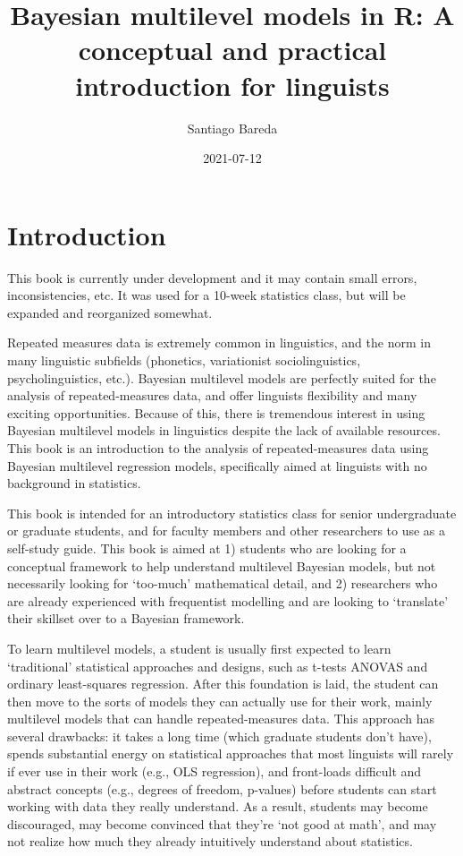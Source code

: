 \documentclass[
]{book}
\title{Bayesian multilevel models in R: A conceptual and practical introduction for linguists}
\author{Santiago Bareda}
\date{2021-07-12}
\begin{document}
\maketitle

{
\setcounter{tocdepth}{1}
\tableofcontents
}
\hypertarget{introduction}{%
\chapter*{Introduction}\label{introduction}}

This book is currently under development and it may contain small errors, inconsistencies, etc. It was used for a 10-week statistics class, but will be expanded and reorganized somewhat.

Repeated measures data is extremely common in linguistics, and the norm in many linguistic subfields (phonetics, variationist sociolinguistics, psycholinguistics, etc.). Bayesian multilevel models are perfectly suited for the analysis of repeated-measures data, and offer linguists flexibility and many exciting opportunities. Because of this, there is tremendous interest in using Bayesian multilevel models in linguistics despite the lack of available resources. This book is an introduction to the analysis of repeated-measures data using Bayesian multilevel regression models, specifically aimed at linguists with no background in statistics.

This book is intended for an introductory statistics class for senior undergraduate or graduate students, and for faculty members and other researchers to use as a self-study guide. This book is aimed at 1) students who are looking for a conceptual framework to help understand multilevel Bayesian models, but not necessarily looking for `too-much' mathematical detail, and 2) researchers who are already experienced with frequentist modelling and are looking to `translate' their skillset over to a Bayesian framework.

To learn multilevel models, a student is usually first expected to learn `traditional' statistical approaches and designs, such as t-tests ANOVAS and ordinary least-squares regression. After this foundation is laid, the student can then move to the sorts of models they can actually use for their work, mainly multilevel models that can handle repeated-measures data. This approach has several drawbacks: it takes a long time (which graduate students don't have), spends substantial energy on statistical approaches that most linguists will rarely if ever use in their work (e.g., OLS regression), and front-loads difficult and abstract concepts (e.g., degrees of freedom, p-values) before students can start working with data they really understand. As a result, students may become discouraged, may become convinced that they're `not good at math', and may not realize how much they already intuitively understand about statistics.
\end{document}
